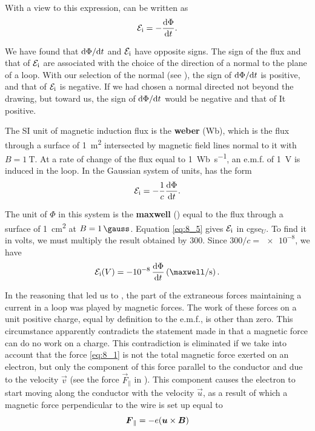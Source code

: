 \noindent
With a view to this expression,  can be written as
\begin{equation}\label{eq:8_4}
    \mathcal{E}_{\text{i}} = - \dfrac{\mathrm{d}\Phi}{\mathrm{d} t}.
\end{equation}

We have found that $\mathrm{d}\Phi/\mathrm{d} t$ and $\mathcal{E}_{\text{i}}$ have opposite signs.
The sign of the flux and that of $\mathcal{E}_{\text{i}}$ are associated with the choice of the direction of a normal to the plane of a loop.
With our selection of the normal (see ), the sign of $\mathrm{d}\Phi/\mathrm{d} t$ is positive, and that of $\mathcal{E}_{\text{i}}$ is negative.
If we had chosen a normal directed not beyond the drawing, but toward us, the sign of $\mathrm{d}\Phi/\mathrm{d} t$ would be negative and that of It
positive.

The SI unit of magnetic induction flux is the \textbf{weber} (\si{\weber}), which is the flux through a surface of \SI{1}{\metre\squared} intersected by magnetic field lines normal to it with $B = \SI{1}{\tesla}$.
At a rate of change of the flux equal to \SI{1}{\weber\per\second}, an e.m.f. of \SI{1}{\volt} is induced in the loop.
In the Gaussian system of units,  has the form
\begin{equation}\label{eq:8_5}
    \mathcal{E}_{\text{i}} = - \frac{1}{c} \dfrac{\mathrm{d}\Phi}{\mathrm{d} t}.
\end{equation}

\noindent
The unit of $\Phi$ in this system is the \textbf{maxwell} (\si{\maxwell}) equal to the flux through a surface of \SI{1}{\centi\metre\squared} at $B = \SI{1}{\gauss}$.
Equation \eqref{eq:8_5} gives $\mathcal{E}_{\text{i}}$
in cgse$_U$.
To find it in volts, we must multiply the result obtained by $300$. Since $300/c = \num{e-8}$, we have
\begin{equation}\label{eq:8_6}
    \ab{\mathcal{E}}{i}(V) = -\num{e-8}\, \diff{\Phi}{t} \parenthesis{\si{\maxwell\per\second}}.
\end{equation}

In the reasoning that led us to , the part of the extraneous forces maintaining a current in a loop was played by magnetic forces.
The work of these forces on a unit positive charge, equal by definition to the e.m.f., is other than zero.
This circumstance apparently contradicts the statement made in  that a magnetic force can do no work on a charge.
This contradiction is eliminated if we take into account that the force \eqref{eq:8_1} is not the total magnetic force exerted on an electron, but only the component of this force parallel to the conductor and due to the velocity $\vec{v}$ (see the force $\vec{F}_{\parallel}$ in ).
This component causes the electron to start moving along the conductor with the velocity $\vec{u}$, as a result of which a magnetic force perpendicular to the wire is set up equal to
\begin{equation*}
    \boldsymbol{F}_{\parallel} = - e (\boldsymbol{u}\times\boldsymbol{B})
\end{equation*}

